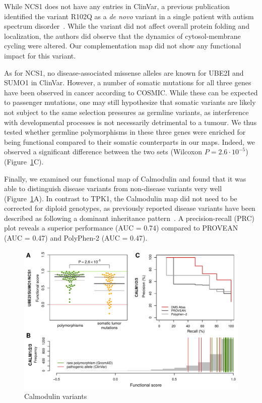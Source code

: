 While NCS1 does not have any entries in ClinVar, a previous publication identified the variant R102Q as a \textit{de novo} variant in a single patient with autism spectrum disorder~\cite{handley_structural_2010}. While the variant did not affect overall protein folding and localization, the authors did observe that the dynamics of cytosol-membrane cycling were altered. Our complementation map did not show any functional impact for this variant.

As for NCS1, no disease-associated missense alleles are known for UBE2I and SUMO1 in ClinVar. However, a number of somatic mutations for all three genes have been observed in cancer according to COSMIC. While these can be expected to passenger mutations, one may still hypothesize that somatic variants are likely not subject to the same selection pressures as germline variants, as interference with developmental processes is not necessarily detrimental to a tumour. We thus tested whether germline polymorphisms in these three genes were enriched for being functional compared to their somatic counterparts in our maps. Indeed, we observed a significant difference between the two sets (Wilcoxon $P = 2.6 \cdot 10^{-5}$) (Figure~\ref{fig:calm_disease}C).

Finally, we examined our functional map of Calmodulin and found that it was able to distinguish disease variants from non-disease variants very well (Figure~\ref{fig:calm_disease}A). In contrast to TPK1, the Calmodulin map did not need to be corrected for diploid genotypes, as previously reported disease variants have been described as following a dominant inheritance pattern~\cite{crotti_calmodulin_2013}. A precision-recall (PRC) plot reveals a superior performance (AUC = 0.74) compared to PROVEAN (AUC = 0.47) and PolyPhen-2 (AUC = 0.47).  

\begin{figure}[h!]
	\centering
	\includegraphics[width=\textwidth]{img/calm_disease.pdf}
	\caption{Calmodulin variants}
	\label{fig:calm_disease}
\end{figure}


